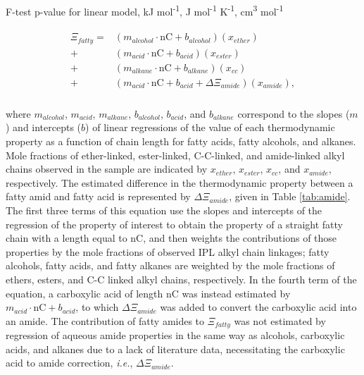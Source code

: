 {\begin{table}
\begin{threeparttable}
\begin{tablenotes}
     F-test p-value for linear model,
     kJ mol\textsuperscript{-1},
     J mol\textsuperscript{-1} K\textsuperscript{-1},
     cm\textsuperscript{3} mol\textsuperscript{-1}
    \item
        
  \end{tablenotes}
  
  \label{tab:regress_chain_prop}
  \end{threeparttable}
\end{table}
\setcounter{tabcounter}{0} %
\doublespace
\clearpage
}


\begin{align}
\begin{split}
\Xi_{fatty} = & (m_{alcohol}\cdot \text{nC} + b_{alcohol})(x_{ether}) \\
            + & (m_{acid}\cdot \text{nC} + b_{acid})(x_{ester}) \\
            + & (m_{alkane}\cdot \text{nC} + b_{alkane})(x_{cc}) \\
            + & (m_{acid}\cdot \text{nC} + b_{acid} + \Delta\Xi_{amide})(x_{amide}), \\
\end{split}
\end{align}

\noindent where $m_{alcohol}$, $m_{acid}$, $m_{alkane}$, $b_{alcohol}$, $b_{acid}$, and $b_{alkane}$ correspond to the slopes ($m$) and intercepts ($b$) of linear regressions of the value of each thermodynamic property as a function of chain length for fatty acids, fatty alcohols, and alkanes. Mole fractions of ether-linked, ester-linked, C-C-linked, and amide-linked alkyl chains observed in the sample are indicated by $x_{ether}$, $x_{ester}$, $x_{cc}$, and $x_{amide}$, respectively. The estimated difference in the thermodynamic property between a fatty amid and fatty acid is represented by $\Delta\Xi_{amide}$, given in Table \ref{tab:amide}. The first three terms of this equation use the slopes and intercepts of the regression of the property of interest to obtain the property of a straight fatty chain with a length equal to nC, and then weights the contributions of those properties by the mole fractions of observed IPL alkyl chain linkages; fatty alcohols, fatty acids, and fatty alkanes are weighted by the mole fractions of ethers, esters, and C-C linked alkyl chains, respectively. In the fourth term of the equation, a carboxylic acid of length nC was instead estimated by $m_{acid}\cdot \text{nC} + b_{acid}$, to which $\Delta\Xi_{amide}$ was added to convert the carboxylic acid into an amide. The contribution of fatty amides to $\Xi_{fatty}$ was not estimated by regression of aqueous amide properties in the same way as alcohols, carboxylic acids, and alkanes due to a lack of literature data, necessitating the carboxylic acid to amide correction, \textit{i.e.}, $\Delta\Xi_{amide}$.


